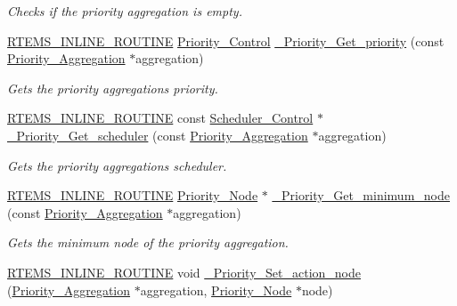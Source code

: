 \begin{DoxyCompactItemize}
\begin{DoxyCompactList}\small\item\em Checks if the priority aggregation is empty. \end{DoxyCompactList}\item 
\mbox{\hyperlink{group__RTEMSScoreBaseDefs_gac216239df231d5dbd15e3520b0b9313f}{R\+T\+E\+M\+S\+\_\+\+I\+N\+L\+I\+N\+E\+\_\+\+R\+O\+U\+T\+I\+NE}} \mbox{\hyperlink{group__RTEMSScorePriority_ga59d02b58072d31a9a1cfe644557aefe2}{Priority\+\_\+\+Control}} \mbox{\hyperlink{group__RTEMSScorePriority_gaea7676bde1276ab7042195c043e25bd5}{\+\_\+\+Priority\+\_\+\+Get\+\_\+priority}} (const \mbox{\hyperlink{structPriority__Aggregation}{Priority\+\_\+\+Aggregation}} $\ast$aggregation)
\begin{DoxyCompactList}\small\item\em Gets the priority aggregation\textquotesingle{}s priority. \end{DoxyCompactList}\item 
\mbox{\hyperlink{group__RTEMSScoreBaseDefs_gac216239df231d5dbd15e3520b0b9313f}{R\+T\+E\+M\+S\+\_\+\+I\+N\+L\+I\+N\+E\+\_\+\+R\+O\+U\+T\+I\+NE}} const \mbox{\hyperlink{struct__Scheduler__Control}{Scheduler\+\_\+\+Control}} $\ast$ \mbox{\hyperlink{group__RTEMSScorePriority_ga9d5749b9c6af6a152e99ec4f60ba8d64}{\+\_\+\+Priority\+\_\+\+Get\+\_\+scheduler}} (const \mbox{\hyperlink{structPriority__Aggregation}{Priority\+\_\+\+Aggregation}} $\ast$aggregation)
\begin{DoxyCompactList}\small\item\em Gets the priority aggregation\textquotesingle{}s scheduler. \end{DoxyCompactList}\item 
\mbox{\hyperlink{group__RTEMSScoreBaseDefs_gac216239df231d5dbd15e3520b0b9313f}{R\+T\+E\+M\+S\+\_\+\+I\+N\+L\+I\+N\+E\+\_\+\+R\+O\+U\+T\+I\+NE}} \mbox{\hyperlink{structPriority__Node}{Priority\+\_\+\+Node}} $\ast$ \mbox{\hyperlink{group__RTEMSScorePriority_ga8a6a36d25c2f1d7e797a252b79888445}{\+\_\+\+Priority\+\_\+\+Get\+\_\+minimum\+\_\+node}} (const \mbox{\hyperlink{structPriority__Aggregation}{Priority\+\_\+\+Aggregation}} $\ast$aggregation)
\begin{DoxyCompactList}\small\item\em Gets the minimum node of the priority aggregation. \end{DoxyCompactList}\item 
\mbox{\hyperlink{group__RTEMSScoreBaseDefs_gac216239df231d5dbd15e3520b0b9313f}{R\+T\+E\+M\+S\+\_\+\+I\+N\+L\+I\+N\+E\+\_\+\+R\+O\+U\+T\+I\+NE}} void \mbox{\hyperlink{group__RTEMSScorePriority_gaebeadb369618aee744159e9edea5e10b}{\+\_\+\+Priority\+\_\+\+Set\+\_\+action\+\_\+node}} (\mbox{\hyperlink{structPriority__Aggregation}{Priority\+\_\+\+Aggregation}} $\ast$aggregation, \mbox{\hyperlink{structPriority__Node}{Priority\+\_\+\+Node}} $\ast$node)

\end{DoxyCompactItemize}
